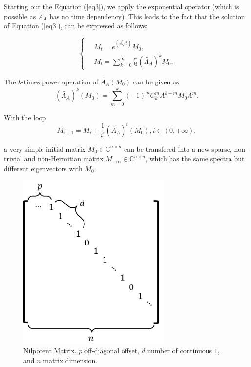Starting out the Equation (\ref{eq3}), we apply the exponential operator (which is possible as $\bar{A_A}$ has no time dependency). This leads to the fact that the solution of Equation  (\ref{eq3}), can be expressed as follows:

\begin{equation}
\label{eq4}
\left\{\
\begin{aligned} 
&M_t = e^{(\widetilde{A_At})}M_0, \\ 
&M_t=\sum_{k=0}^{\infty} \frac{t^k}{k!}(\widetilde{A_A})^kM_0.
\end{aligned}
\right.
\end{equation}

The $k$-times power operation of $\widetilde{A_A}(M_0)$ can be given as
\begin{equation}
(\widetilde{A_A})^k(M_0)=\sum_{m=0}^{k}(-1)^mC_k^mA^{k-m}M_0A^m.
\end{equation}

With the loop 
\begin{equation}
M_{i+1}=M_i+\frac{1}{i!}(\widetilde{A_A})^i(M_0), i\in(0,+\infty),
\end{equation}

a very simple initial matrix $M_0 \in \mathbb{C}^{n \times n}$ can be transfered into a new sparse, non-trivial and non-Hermitian matrix $M_{+\infty} \in \mathbb{C}^{n \times n}$, which has the same spectra but different eigenvectors with $M_0$.

\begin{figure}[t]
	\centering
	\includegraphics[width=3.0in]{fig/nilpotent_matrix.pdf}
	\caption{Nilpotent Matrix. $p$ off-diagonal offset, $d$ number of continuous $1$, and $n$ matrix dimension.}
	\label{fig:nilpotent}
\end{figure}

